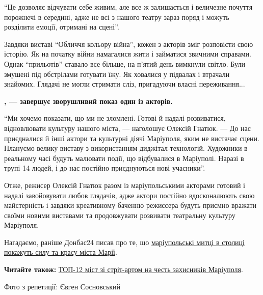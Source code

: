 \enquote{Це дозволяє відчувати себе живим, але все ж залишається і величезне почуття
порожнечі в середині, адже не всі з нашого театру зараз поряд і можуть
розділити емоції, отримані на сцені}.

Завдяки виставі \enquote{Обличчя кольору війна}, кожен з акторів зміг розповісти свою
історію. Як на початку війни намагалися жити і займатися звичними справами.
Однак \enquote{прильотів} ставало все більше, на п'ятий день вимкнули світло. Були
змушені під обстрілами готувати їжу. Як ховалися у підвалах і втрачали
знайомих. Глядачі не могли стримати сліз, пригадуючи власні переживання...

\begin{leftbar}
	\begingroup
		\bfseries
{}, — завершує зворушливий показ один із акторів.
	\endgroup
\end{leftbar}


\enquote{Ми хочемо показати, що ми не зломлені. Готові й надалі розвиватися,
відновлювати культуру нашого міста, — наголошує Олексій Гнатюк. — До нас
приєдналися й інші актори та культурні діячі Маріуполя, яким не вистачає сцени.
Плануємо велику виставу з використанням диджітал-технологій. Художники в
реальному часі будуть малювати події, що відбувалися в Маріуполі. Наразі в
трупі 14 людей, і до нас постійно приєднуються нові учасники}.

Отже, режисер Олексій Гнатюк разом із маріупольськими акторами готовий і надалі
завойовувати любов глядачів, адже актори постійно вдосконалюють свою
майстерність і завдяки креативному баченню режиссера будуть приємно вражати
своїми новими виставами та продовжувати розвивати театральну культуру
Маріуполя.

Нагадаємо, раніше Донбас24 писав про те, що \href{https://donbas24.news/news/mariupolski-mitci-u-stolici-pokazut-silu-ta-krasu-mista-mariyi-de-podivitisya}{маріупольські митці в столиці
покажуть силу та красу міста Марії}.

\textbf{Читайте також:} \href{https://donbas24.news/news/nezlamna-azovstal-top-12-mist-zi-stritartom-na-cest-zaxisnikiv-mariupolya}{ТОП-12 міст зі стріт-артом на честь захисників Маріуполя}.

Фото з репетиції: Євген Сосновський



